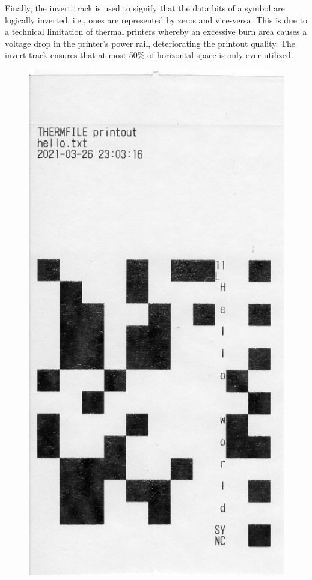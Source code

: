 \documentclass{article}
\begin{document}
	Finally, the invert track is used to signify that the data bits of a symbol
	are logically inverted, i.e., ones are represented by zeros and vice-versa.
	This is due to a technical limitation of thermal printers whereby an
	excessive burn area causes a voltage drop in the printer's power rail,
	deteriorating the printout quality. The invert track ensures that at most
	50\% of horizontal space is only ever utilized.
	
	\begin{landscape}
		\begin{figure}[h]
				\includegraphics[width=\linewidth]{img/helloworld}

\end{figure}
\end{landscape}
\end{document}

